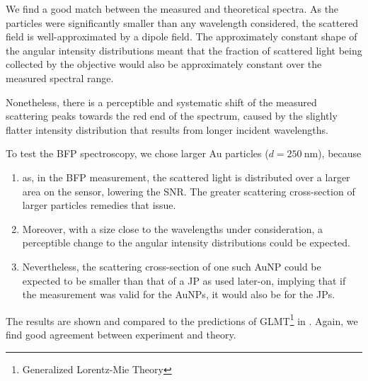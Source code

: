 \documentclass[10pt]{article}
\newcommand{\reffig}[2]{\mbox{\sffamily{Figure \ref{#1}#2}}}
\begin{document}

We find a good match between the measured and theoretical spectra. 
As the particles were significantly smaller than any wavelength considered, the scattered field is well-approximated by a dipole field. 
The approximately constant shape of the angular intensity distributions meant that the fraction of scattered light being collected by the objective would also be approximately constant over the measured spectral range.

Nonetheless, there is a perceptible and systematic shift of the measured scattering peaks towards the red end of the spectrum, caused by the slightly flatter intensity distribution that results from longer incident wavelengths.


To test the BFP spectroscopy, we chose larger Au particles ($d=\SI{250}{\nano\meter}$), because
\begin{enumerate}[label=(\alph*)]
    \item as, in the BFP measurement, the scattered light is distributed over a larger area on the sensor, lowering the SNR. The greater scattering cross-section of larger particles remedies that issue. 
    \item Moreover, with a size close to the wavelengths under consideration, a perceptible change to the angular intensity distributions could be expected. 
    \item Nevertheless, the scattering cross-section of one such AuNP could be expected to be smaller than that of a JP as used later-on, implying that if the measurement was valid for the AuNPs, it would also be for the JPs. 
\end{enumerate}

The results are shown and compared to the predictions of GLMT\footnote{Generalized Lorentz-Mie Theory}\cite{BohrenHuffman, GouesbetGrehan} in \reffig{fig:AuNP}{B}. 
Again, we find good agreement between experiment and theory. 
\end{document}
